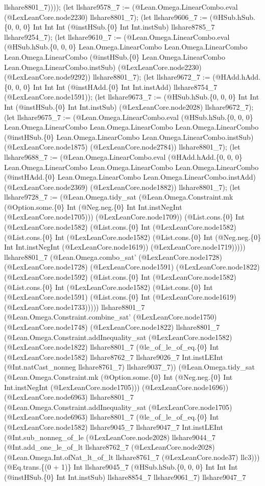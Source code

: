 \documentclass[11pt]{article}
\begin{document}
llshare8801\_7)))); (let llshare9578\_7 := (@Lean.Omega.LinearCombo.eval (@LexLeanCore.node2230) llshare8801\_7); (let llshare9606\_7 := (@HSub.hSub.\{0, 0, 0\} Int Int Int (@instHSub.\{0\} Int Int.instSub) llshare8785\_7 llshare9254\_7); (let llshare9610\_7 := (@Lean.Omega.LinearCombo.eval (@HSub.hSub.\{0, 0, 0\} Lean.Omega.LinearCombo Lean.Omega.LinearCombo Lean.Omega.LinearCombo (@instHSub.\{0\} Lean.Omega.LinearCombo Lean.Omega.LinearCombo.instSub) (@LexLeanCore.node2230) (@LexLeanCore.node9292)) llshare8801\_7); (let llshare9672\_7 := (@HAdd.hAdd.\{0, 0, 0\} Int Int Int (@instHAdd.\{0\} Int Int.instAdd) llshare8754\_7 (@LexLeanCore.node1591)); (let llshare9673\_7 := (@HSub.hSub.\{0, 0, 0\} Int Int Int (@instHSub.\{0\} Int Int.instSub) (@LexLeanCore.node2028) llshare9672\_7); (let llshare9675\_7 := (@Lean.Omega.LinearCombo.eval (@HSub.hSub.\{0, 0, 0\} Lean.Omega.LinearCombo Lean.Omega.LinearCombo Lean.Omega.LinearCombo (@instHSub.\{0\} Lean.Omega.LinearCombo Lean.Omega.LinearCombo.instSub) (@LexLeanCore.node1875) (@LexLeanCore.node2784)) llshare8801\_7); (let llshare9688\_7 := (@Lean.Omega.LinearCombo.eval (@HAdd.hAdd.\{0, 0, 0\} Lean.Omega.LinearCombo Lean.Omega.LinearCombo Lean.Omega.LinearCombo (@instHAdd.\{0\} Lean.Omega.LinearCombo Lean.Omega.LinearCombo.instAdd) (@LexLeanCore.node2369) (@LexLeanCore.node1882)) llshare8801\_7); (let llshare9728\_7 := (@Lean.Omega.tidy\_sat (@Lean.Omega.Constraint.mk (@Option.some.\{0\} Int (@Neg.neg.\{0\} Int Int.instNegInt (@LexLeanCore.node1705))) (@LexLeanCore.node1709)) (@List.cons.\{0\} Int (@LexLeanCore.node1582) (@List.cons.\{0\} Int (@LexLeanCore.node1582) (@List.cons.\{0\} Int (@LexLeanCore.node1582) (@List.cons.\{0\} Int (@Neg.neg.\{0\} Int Int.instNegInt (@LexLeanCore.node1619)) (@LexLeanCore.node1719))))) llshare8801\_7 (@Lean.Omega.combo\_sat' (@LexLeanCore.node1728) (@LexLeanCore.node1728) (@LexLeanCore.node1591) (@LexLeanCore.node1822) (@LexLeanCore.node1592) (@List.cons.\{0\} Int (@LexLeanCore.node1582) (@List.cons.\{0\} Int (@LexLeanCore.node1582) (@List.cons.\{0\} Int (@LexLeanCore.node1591) (@List.cons.\{0\} Int (@LexLeanCore.node1619) (@LexLeanCore.node1733))))) llshare8801\_7 (@Lean.Omega.Constraint.combine\_sat' (@LexLeanCore.node1750) (@LexLeanCore.node1748) (@LexLeanCore.node1822) llshare8801\_7 (@Lean.Omega.Constraint.addInequality\_sat (@LexLeanCore.node1582) (@LexLeanCore.node1822) llshare8801\_7 (@le\_of\_le\_of\_eq.\{0\} Int (@LexLeanCore.node1582) llshare8762\_7 llshare9026\_7 Int.instLEInt (@Int.natCast\_nonneg llshare8761\_7) llshare9037\_7)) (@Lean.Omega.tidy\_sat (@Lean.Omega.Constraint.mk (@Option.some.\{0\} Int (@Neg.neg.\{0\} Int Int.instNegInt (@LexLeanCore.node1705))) (@LexLeanCore.node1696)) (@LexLeanCore.node6963) llshare8801\_7 (@Lean.Omega.Constraint.addInequality\_sat (@LexLeanCore.node1705) (@LexLeanCore.node6963) llshare8801\_7 (@le\_of\_le\_of\_eq.\{0\} Int (@LexLeanCore.node1582) llshare9045\_7 llshare9047\_7 Int.instLEInt (@Int.sub\_nonneg\_of\_le (@LexLeanCore.node2028) llshare9044\_7 (@Int.add\_one\_le\_of\_lt llshare8762\_7 (@LexLeanCore.node2028) (@Lean.Omega.Int.ofNat\_lt\_of\_lt llshare8761\_7 (@LexLeanCore.node37) llc3))) (@Eq.trans.\{(0 + 1)\} Int llshare9045\_7 (@HSub.hSub.\{0, 0, 0\} Int Int Int (@instHSub.\{0\} Int Int.instSub) llshare8854\_7 llshare9061\_7) llshare9047\_7 
\end{document}
